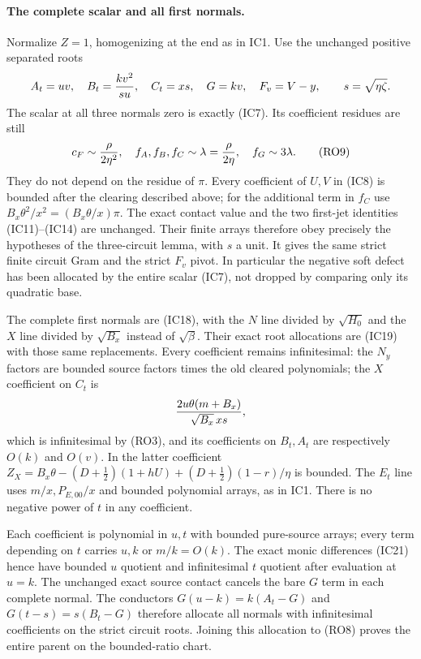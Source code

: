 \paragraph{The complete scalar and all first normals.}
Normalize $Z=1$, homogenizing at the end as in IC1. Use the unchanged
positive separated roots
\[
 A_t=uv,\quad B_t={kv^2\over s u},\quad C_t=xs,\quad
 G=kv,\quad F_v=V-y,\qquad s=\sqrt{\eta\zeta}.
\]
The scalar at all three normals zero is exactly (IC7). Its coefficient
residues are still
\[
 c_F\sim{\rho\over2\eta^2},\quad
 f_A,f_B,f_C\sim\lambda={\rho\over2\eta},\quad
 f_G\sim3\lambda.                                   \tag{RO9}
\]
They do not depend on the residue of $\pi$. Every coefficient of
$U,V$ in (IC8) is bounded after the clearing described above;
for the additional term in $f_C$ use
$B_x\theta^2/x^2=(B_x\theta/x)\pi$. The exact contact
value and the two first-jet identities (IC11)--(IC14) are unchanged.
Their finite arrays therefore obey precisely the hypotheses of the
three-circuit lemma, with $s$ a unit. It gives the same strict finite
circuit Gram and the strict $F_v$ pivot. In particular the negative
soft defect has been allocated by the entire scalar (IC7), not
dropped by comparing only its quadratic base.

The complete first normals are (IC18), with the $N$ line divided
by $\sqrt{H_0}$ and the $X$ line divided by $\sqrt{B_x}$
instead of $\sqrt\beta$. Their exact root allocations are (IC19)
with those same replacements. Every coefficient remains infinitesimal:
the $N_y$ factors are bounded source factors times the old cleared
polynomials; the $X$ coefficient on $C_t$ is
\[
 {2u\theta(m+B_x)\over\sqrt{B_x}\,xs},
\]
which is infinitesimal by (RO3), and its coefficients on $B_t,A_t$
are respectively $O(k)$ and $O(v)$. In the latter coefficient
$Z_X=B_x\theta-(D+\tfrac12)(1+hU)
 +(D+\tfrac12)(1-r)/\eta$ is bounded. The $E_t$ line uses
$m/x,P_{E,00}/x$ and bounded polynomial arrays, as in IC1.
There is no negative power of $t$ in any coefficient.

Each coefficient is polynomial in $u,t$ with bounded pure-source
arrays; every term depending on $t$ carries $u,k$ or $m/k=O(k)$.
The exact monic differences (IC21) hence have bounded $u$ quotient
and infinitesimal $t$ quotient after evaluation at $u=k$. The
unchanged exact source contact cancels the bare $G$ term in each
complete normal. The conductors
$G(u-k)=k(A_t-G)$ and $G(t-s)=s(B_t-G)$ therefore allocate
all normals with infinitesimal coefficients on the strict circuit
roots. Joining this allocation to (RO8) proves the entire parent
on the bounded-ratio chart.

